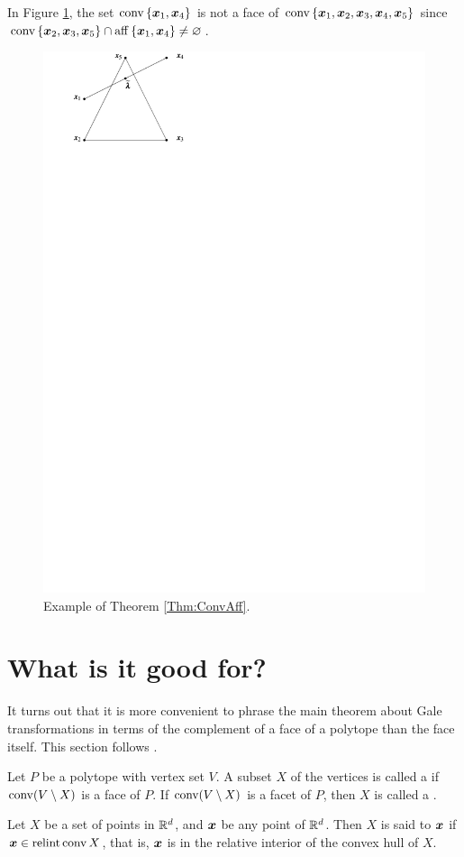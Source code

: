     \begin{Example}
        In Figure \ref{Fig:FivePts}, the set \(\operatorname{conv}\left\{\bm{x}_1,\bm{x}_4\right\}\) is not a face of \(\operatorname{conv}\left\{\bm{x}_1,\bm{x}_2,\bm{x}_3,\bm{x}_4,\bm{x}_5\right\}\) since \(\operatorname{conv}\left\{\bm{x}_2,\bm{x}_3,\bm{x}_5\right\}\cap\operatorname{aff}\left\{\bm{x}_1,\bm{x}_4\right\}\ne\varnothing\).
    \end{Example}
    \begin{center}
        \begin{figure}[h!bt]
            \includegraphics[page=20, width=.5\textwidth]{pictures.pdf}
            \caption{Example of Theorem \ref{Thm:ConvAff}.\label{Fig:FivePts}}
        \end{figure}
    \end{center}

\section{What is it good for?}
It turns out that it is more convenient to phrase the main theorem about Gale transformations in terms of the complement of a face of a polytope than the face itself. This section follows \cite{McMullenBook}.
\begin{Definition}
    Let \(P\) be a polytope with vertex set \(V\).  A subset \(X\) of the vertices is called a  if \(\operatorname{conv}(V\setminus X)\) is a face of \(P\).  If \(\operatorname{conv}(V\setminus X)\) is a facet of \(P\), then \(X\) is called a .
\end{Definition}

\begin{Definition}
    Let \(X\) be a set of points in \(\mathbb{R}^{d}\), and \(\bm{x}\) be any point of \(\mathbb{R}^{d}\).  Then \(X\) is said to  \(\bm{x}\) if \(\bm{x}\in\operatorname{relint}\operatorname{conv} X\), that is, \(\bm{x}\) is in the relative interior of the convex hull of \(X\).
\end{Definition}

